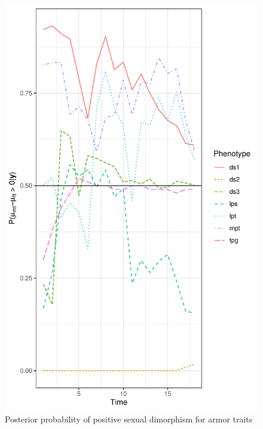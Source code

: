\documentclass[
  12pt,
]{article}
\begin{document}
\begin{figure}

{\centering \includegraphics{../Figures/SD_Figures/post_probs_armor} 

}

\caption{Posterior probability of positive sexual dimorphism for armor traits}\label{fig:unnamed-chunk-2}
\end{figure}

\label{fig:post_probs_armor}
\end{document}

